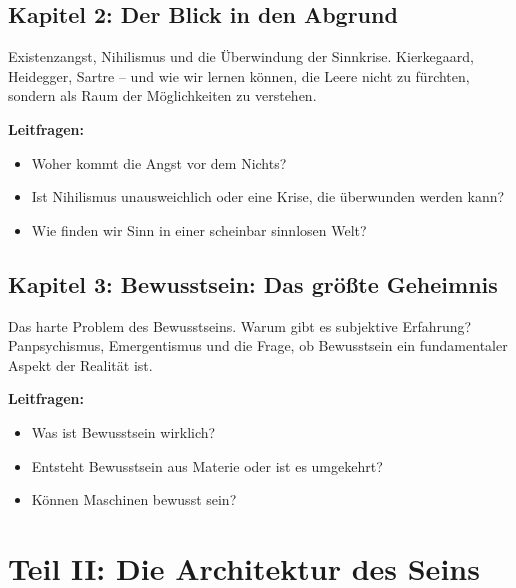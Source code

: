 \section*{Kapitel 2: Der Blick in den Abgrund}

Existenzangst, Nihilismus und die Überwindung der Sinnkrise. Kierkegaard, Heidegger, Sartre – und wie wir lernen können, die Leere nicht zu fürchten, sondern als Raum der Möglichkeiten zu verstehen.

\textbf{Leitfragen:}
\begin{itemize}
	\item Woher kommt die Angst vor dem Nichts?
	\item Ist Nihilismus unausweichlich oder eine Krise, die überwunden werden kann?
	\item Wie finden wir Sinn in einer scheinbar sinnlosen Welt?
\end{itemize}

\section*{Kapitel 3: Bewusstsein: Das größte Geheimnis}

Das harte Problem des Bewusstseins. Warum gibt es subjektive Erfahrung? Panpsychismus, Emergentismus und die Frage, ob Bewusstsein ein fundamentaler Aspekt der Realität ist.

\textbf{Leitfragen:}
\begin{itemize}
	\item Was ist Bewusstsein wirklich?
	\item Entsteht Bewusstsein aus Materie oder ist es umgekehrt?
	\item Können Maschinen bewusst sein?
\end{itemize}


\chapter{Teil II: Die Architektur des Seins}

